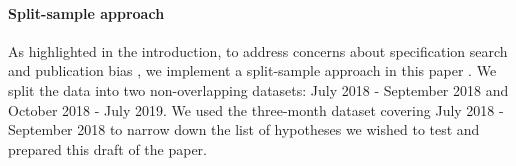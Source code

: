 %
%
%
%	
%

\paragraph{Split-sample approach}

As highlighted in the introduction, to address concerns about specification search and publication bias \citep{Leamer1978,Leamer1983,Glaeser2006_incentives}, we implement a split-sample approach in this paper \citep{FafchampsLabonne2016,FafchampsLabonne2017,AndersonMagruder2017}. We split the data into two non-overlapping datasets: July 2018 - September 2018 and October 2018 - July 2019. We used the three-month dataset covering July 2018 - September 2018 to narrow down the list of hypotheses we wished to test and prepared this draft of the paper.


